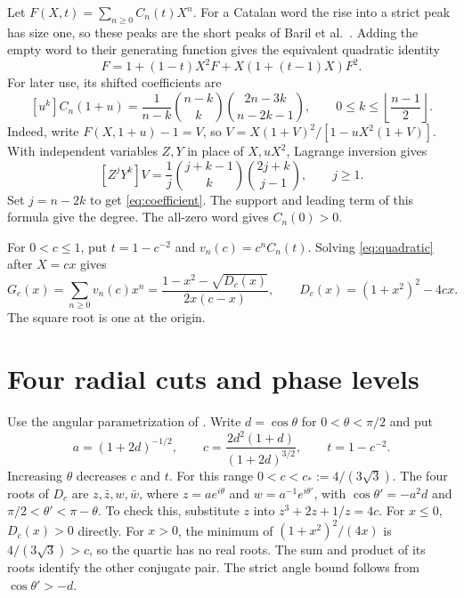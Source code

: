 \documentclass[11pt]{article}
\begin{document}
Let \(F(X,t)=\sum_{n\ge0}C_n(t)X^n\). For a Catalan word the rise into a strict peak has size one, so these peaks are the short peaks of Baril et al.~\cite[Theorem~5.1, \(\ell=1\)]{baril}. Adding the empty word to their generating function gives the equivalent quadratic identity
\begin{equation}\label{eq:quadratic}
F=1+(1-t)X^2F+X(1+(t-1)X)F^2.
\end{equation}
For later use, its shifted coefficients are
\begin{equation}\label{eq:coefficient}
[u^k]C_n(1+u)=\frac1{n-k}\binom{n-k}{k}\binom{2n-3k}{n-2k-1},
\qquad 0\le k\le \left\lfloor\frac{n-1}{2}\right\rfloor .
\end{equation}
Indeed, write \(F(X,1+u)-1=V\), so \(V=X(1+V)^2/[1-uX^2(1+V)]\). With independent variables \(Z,Y\) in place of \(X,uX^2\), Lagrange inversion gives
\[
[Z^jY^k]V=\frac1j\binom{j+k-1}{k}\binom{2j+k}{j-1},\qquad j\ge1.
\]
Set \(j=n-2k\) to get \eqref{eq:coefficient}. The support and leading term of this formula give the degree. The all-zero word gives \(C_n(0)>0\).

For \(0<c\le1\), put \(t=1-c^{-2}\) and \(v_n(c)=c^n C_n(t)\). Solving \eqref{eq:quadratic} after \(X=cx\) gives
\begin{equation}\label{eq:gf}
G_c(x)=\sum_{n\ge0}v_n(c)x^n
=\frac{1-x^2-\sqrt{D_c(x)}}{2x(c-x)},
\qquad D_c(x)=(1+x^2)^2-4cx.
\end{equation}
The square root is one at the origin.

\section{Four radial cuts and phase levels}\label{sec:rays}
Use the angular parametrization of \cite[\S1]{eventual}. Write $d=\cos\theta$ for $0<\theta<\pi/2$ and put
\[
a=(1+2d)^{-1/2},\qquad
c=\frac{2d^2(1+d)}{(1+2d)^{3/2}},\qquad t=1-c^{-2}.
\]
Increasing $\theta$ decreases $c$ and $t$. For this range \(0<c<c_*:=4/(3\sqrt3)\). The four roots of $D_c$ are $z,\bar z,w,\bar w$, where $z=ae^{i\theta}$ and $w=a^{-1}e^{i\theta'}$, with $\cos\theta'=-a^2d$ and $\pi/2<\theta'<\pi-\theta$. To check this, substitute $z$ into $z^3+2z+1/z=4c$. For $x\le0$, $D_c(x)>0$ directly. For $x>0$, the minimum of $(1+x^2)^2/(4x)$ is $4/(3\sqrt3)>c$, so the quartic has no real roots. The sum and product of its roots identify the other conjugate pair. The strict angle bound follows from $\cos\theta'>-d$.
\end{document}
